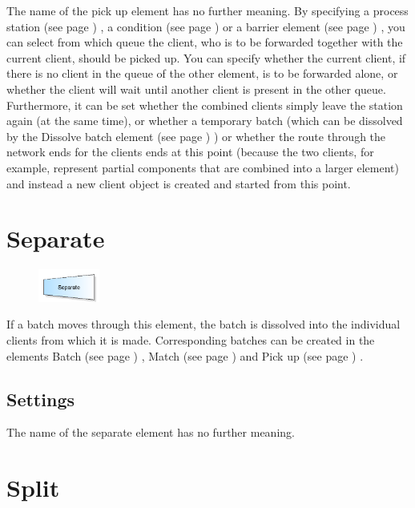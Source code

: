 The name of the pick up element has no further meaning. By specifying a
process station (see page \pageref{ref:ModelElementProcess}) , a condition (see page \pageref{ref:ModelElementHold}) 
or a barrier element (see page \pageref{ref:ModelElementBarrier}) , you can select from which queue the client,
who is to be forwarded together with the current client, should be picked up. You can specify whether
the current client, if there is no client in the queue of the other element, is to be forwarded alone, or
whether the client will wait until another client is present in the other queue. Furthermore, it can be set whether
the combined clients simply leave the station again (at the same time), or whether a temporary batch (which
can be dissolved by the Dissolve batch element (see page \pageref{ref:ModelElementSeparate}) ) or whether the route
through the network ends for the clients ends at this point (because the two clients, for example, represent
partial components that are combined into a larger element) and instead a new client object is created and
started from this point.


\section{Separate}
\label{ref:ModelElementSeparate}

\begin{figure}
\vspace{-22pt}
\includegraphics[width=2cm]{imageModelElementSeparate.png}
\vspace{-22pt}
\end{figure}

If a batch moves through this element, the batch is dissolved into the individual clients from which it is made.
Corresponding batches can be created in the elements Batch (see page \pageref{ref:ModelElementBatch}) ,
Match (see page \pageref{ref:ModelElementMatch}) and Pick up (see page \pageref{ref:ModelElementPickUp}) .

\subsection*{Settings}

The name of the separate element has no further meaning.


\section{Split}
\label{ref:ModelElementSplit}

